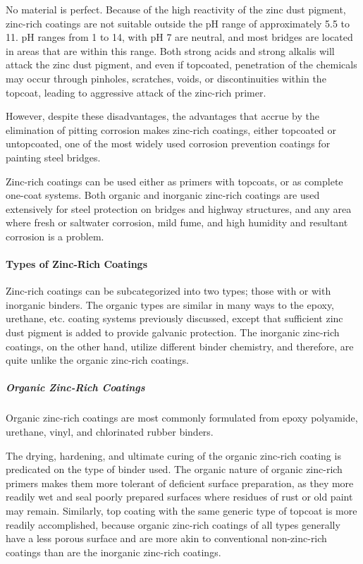 No material is perfect. Because of the high reactivity of the zinc dust pigment, zinc-rich coatings are not suitable
outside the pH range of approximately 5.5 to 11. pH ranges from 1 to 14, with pH 7 are neutral, and most bridges are
located in areas that are within this range. Both strong acids and strong alkalis will attack the zinc dust pigment, and
even if topcoated, penetration of the chemicals may occur through pinholes, scratches, voids, or discontinuities
within the topcoat, leading to aggressive attack of the zinc-rich primer.

However, despite these disadvantages, the advantages that accrue by the elimination of pitting corrosion makes
zinc-rich coatings, either topcoated or untopcoated, one of the most widely used corrosion prevention coatings for
painting steel bridges.

Zinc-rich coatings can be used either as primers with topcoats, or as complete one-coat systems. Both organic
and inorganic zinc-rich coatings are used extensively for steel protection on bridges and highway structures, and any
area where fresh or saltwater corrosion, mild fume, and high humidity and resultant corrosion is a problem.


\paragraph{Types of Zinc-Rich Coatings}
Zinc-rich coatings can be subcategorized into two types; those with or with inorganic binders. The organic types
are similar in many ways to the epoxy, urethane, etc. coating systems previously discussed, except that sufficient zinc
dust pigment is added to provide galvanic protection. The inorganic zinc-rich coatings, on the other hand, utilize
different binder chemistry, and therefore, are quite unlike the organic zinc-rich coatings.

\subparagraph{Organic Zinc-Rich Coatings}
Organic zinc-rich coatings are most commonly formulated from epoxy polyamide, urethane, vinyl, and
chlorinated rubber binders.

The drying, hardening, and ultimate curing of the organic zinc-rich coating is predicated on the type of binder
used. The organic nature of organic zinc-rich primers makes them more tolerant of deficient surface preparation, as they more readily wet and seal poorly prepared surfaces where residues of rust or old paint may remain. Similarly,
top coating with the same generic type of topcoat is more readily accomplished, because organic zinc-rich coatings of
all types generally have a less porous surface and are more akin to conventional non-zinc-rich coatings than are the
inorganic zinc-rich coatings.

